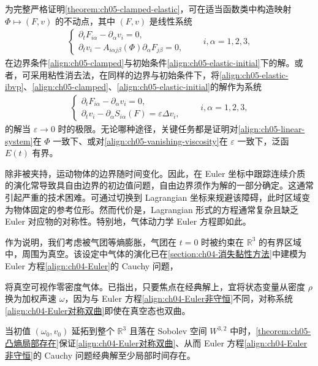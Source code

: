 \documentclass[../../main.tex]{subfiles}
\begin{document}
为完整严格证明\cref{theorem:ch05-clamped-elastic}，可在适当函数类中构造映射 $\Phi\mapsto(F,v)$ 的不动点，其中 $(F,v)$ 是线性系统
\begin{align}
\begin{cases}
\partial_{t}F_{i\alpha}-\partial_{\alpha}v_{i}=0,\\
\partial_{t}v_{i}-A_{i\alpha j\beta}(\Phi)\partial_{\alpha}F_{j\beta}=0,
\end{cases}\qquad i,\alpha=1,2,3,\label{align:ch05-linear-system}
\end{align}
在边界条件\eqref{align:ch05-clamped}与初始条件\eqref{align:ch05-elastic-initial}下的解。或者，可采用粘性消去法，在同样的边界与初始条件下，将\eqref{align:ch05-elastic-ibvp}、\eqref{align:ch05-clamped}、\eqref{align:ch05-elastic-initial}的解作为系统
\begin{align}
\begin{cases}
\partial_{t}F_{i\alpha}-\partial_{\alpha}v_{i}=0,\\
\partial_{t}v_{i}-\partial_{\alpha}S_{i\alpha}(F)=\varepsilon\Delta v_{i},
\end{cases}\qquad i,\alpha=1,2,3,\label{align:ch05-vanishing-viscosity}
\end{align}
的解当 $\varepsilon\to0$ 时的极限。无论哪种途径，关键任务都是证明对\eqref{align:ch05-linear-system}在 $\Phi$ 一致下、或对\eqref{align:ch05-vanishing-viscosity}在 $\varepsilon$ 一致下，泛函 $E(t)$ 有界。

除非被夹持，运动物体的边界随时间变化。因此，在 Euler 坐标中跟踪连续介质的演化常导致具自由边界的初边值问题，自由边界须作为解的一部分确定。这通常引起严重的技术困难。可通过切换到 Lagrangian 坐标来规避该障碍，此时区域变为物体固定的参考位形。然而代价是，Lagrangian 形式的方程通常复杂且缺乏 Euler 对应物的对称性。特别地，气体动力学 Euler 方程即如此。

作为说明，我们考虑被气团等熵膨胀，气团在 $t=0$ 时被约束在 $\mathbb{R}^{3}$ 的有界区域中，周围为真空。该设定中气体的演化已在\cref{section:ch04-消失黏性方法}中建模为 Euler 方程\eqref{align:ch04-Euler}的 Cauchy 问题，

将真空可视作零密度气体。已指出，只要焦点在经典解上，宜将状态变量从密度 $\rho$ 换为加权声速 $\omega$，因为与 Euler 方程\eqref{align:ch04-Euler非守恒}不同，对称系统\eqref{align:ch04-Euler对称双曲}即使在真空态也双曲。

当初值 $(\omega_{0},v_{0})$ 延拓到整个 $\mathbb{R}^{3}$ 且落在 Sobolev 空间 $W^{3,2}$ 中时，\cref{theorem:ch05-凸熵局部存在}保证\eqref{align:ch04-Euler对称双曲}、从而 Euler 方程\eqref{align:ch04-Euler非守恒}的 Cauchy 问题经典解至少局部时间存在。
\end{document}
